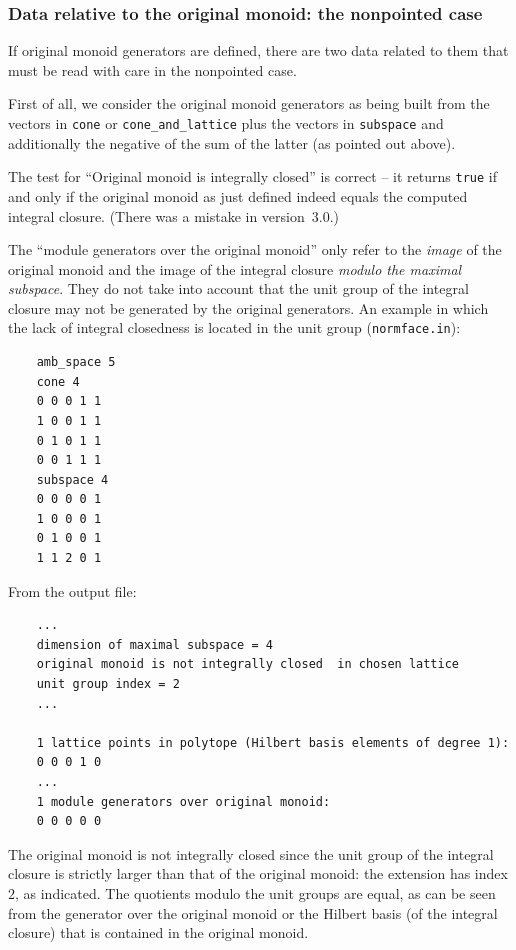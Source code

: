 \subsubsection{Data relative to the original monoid: the nonpointed case}

If original monoid generators are defined, there are two data related to them that must be read with care in the nonpointed case.

First of all, we consider the original monoid generators as being built from the vectors in \verb|cone| or \verb|cone_and_lattice| plus the vectors in \verb|subspace| and additionally the negative of the sum of the latter (as pointed out above).

The test for ``Original monoid is integrally closed'' is correct -- it returns \verb|true| if and only if the original monoid as just defined indeed equals the computed integral closure. (There was a mistake in version~3.0.)

The ``module generators over the original monoid'' only refer to the \emph{image} of the original monoid and the image of the integral closure \emph{modulo the maximal subspace}. They do not take into account that the unit group of the integral closure may not be generated by the original generators. An example in which the lack of integral closedness is located in the unit group (\verb|normface.in|):

\begin{Verbatim}
	amb_space 5
	cone 4
	0 0 0 1 1
	1 0 0 1 1
	0 1 0 1 1
	0 0 1 1 1
	subspace 4
	0 0 0 0 1
	1 0 0 0 1
	0 1 0 0 1
	1 1 2 0 1
\end{Verbatim}

From the output file:

\begin{Verbatim}
	...
	dimension of maximal subspace = 4
	original monoid is not integrally closed  in chosen lattice
	unit group index = 2
	...
	
	1 lattice points in polytope (Hilbert basis elements of degree 1):
	0 0 0 1 0
	...
	1 module generators over original monoid:
	0 0 0 0 0
\end{Verbatim}
The original monoid is not integrally closed since the unit group of the integral closure is strictly larger than that of the original monoid: the extension has index $2$, as indicated. The quotients modulo the unit groups are equal, as can be seen from the generator over the original monoid or the Hilbert basis (of the integral closure) that is contained in the original monoid.

